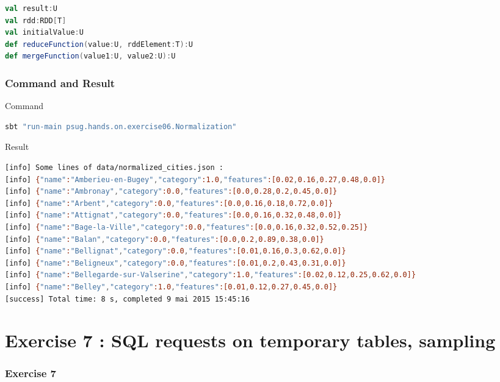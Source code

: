 \documentclass[slidetop,9pt,utf8]{beamer}
\begin{document}
\begin{CJK}{UTF8}{gbsn}
\begin{frame}[fragile]
  \begin{lstlisting}[label=AggregateType, caption=Types over aggregate, language=scala, style=code]
val result:U
val rdd:RDD[T]
val initialValue:U
def reduceFunction(value:U, rddElement:T):U
def mergeFunction(value1:U, value2:U):U
  \end{lstlisting}

\end{frame}

\begin{frame}[fragile]
  \frametitle{Command and Result}

  \begin{block}{Command}
    \begin{lstlisting}[language=bash, style=terminal-medium]
sbt "run-main psug.hands.on.exercise06.Normalization"  
    \end{lstlisting}
  \end{block}

  \begin{block}{Result}
    \begin{lstlisting}[language=bash, style=terminal]
[info] Some lines of data/normalized_cities.json : 
[info] {"name":"Amberieu-en-Bugey","category":1.0,"features":[0.02,0.16,0.27,0.48,0.0]}
[info] {"name":"Ambronay","category":0.0,"features":[0.0,0.28,0.2,0.45,0.0]}
[info] {"name":"Arbent","category":0.0,"features":[0.0,0.16,0.18,0.72,0.0]}
[info] {"name":"Attignat","category":0.0,"features":[0.0,0.16,0.32,0.48,0.0]}
[info] {"name":"Bage-la-Ville","category":0.0,"features":[0.0,0.16,0.32,0.52,0.25]}
[info] {"name":"Balan","category":0.0,"features":[0.0,0.2,0.89,0.38,0.0]}
[info] {"name":"Bellignat","category":0.0,"features":[0.01,0.16,0.3,0.62,0.0]}
[info] {"name":"Beligneux","category":0.0,"features":[0.01,0.2,0.43,0.31,0.0]}
[info] {"name":"Bellegarde-sur-Valserine","category":1.0,"features":[0.02,0.12,0.25,0.62,0.0]}
[info] {"name":"Belley","category":1.0,"features":[0.01,0.12,0.27,0.45,0.0]}
[success] Total time: 8 s, completed 9 mai 2015 15:45:16
    \end{lstlisting}
  \end{block}

\end{frame}

\section{Exercise 7 : SQL requests on temporary tables, sampling}

\begin{frame}
  \frametitle{Exercise 7}


\end{frame}
\end{CJK}
\end{document}
